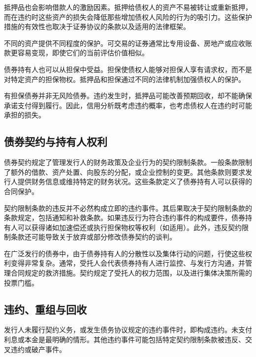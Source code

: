 抵押品也会影响借款人的激励因素。抵押给债权人的资产不易被转让或重新抵押，而在违约时这些资产的损失会降低那些增加债权人风险的行为的吸引力。这些保护措施的有效性也取决于证券协议的条款以及适用的法律框架。

不同的资产提供不同程度的保护。可交易的证券通常比专用设备、房地产或应收账款更容易变现，即使它们的当前评估价值相似。

债券持有人也可以从担保中受益。担保使债权人能够对担保人享有请求权，而不是对特定资产的担保物权。抵押品和担保通过不同的法律机制加强债权人的保护。

\begin{tcolorbox}[
  enhanced,
  breakable,
  colback=white,
  colframe=FinanceBlue,
  boxrule=0.7pt,
  sharp corners,
  borderline west={2.2pt}{0pt}{FinanceBlue},
  title=\textbf{财务展望：安全债券并非无风险之选},
  coltitle=white,
  colbacktitle=FinanceBlue,
  fonttitle=\bfseries,
  before skip=1.2em,
  after skip=1.2em
]

有担保债券并非无风险债券。违约发生时，抵押品可能改善预期回收，却不能确保承诺支付得到履行。因此，信用分析既考虑违约概率，也考虑债权人在违约时可能承担的损失。

\end{tcolorbox}

\subsection{债券契约与持有人权利}

债券契约规定了管理发行人的财务政策及企业行为的契约限制条款。一般条款限制了额外的借款、资产处置、向股东的分配，或企业控制的变更。其他条款则要求发行人提供财务信息或维持特定的财务状况。这些条款定义了债券持有人可以获得的合同保护。

契约限制条款的违反并不必然构成立即的违约事件。其后果取决于契约限制条款的条款规定，包括通知和补救条款。如果违反行为符合违约事件的构成要件，债券持有人可以获得诸如加速偿还或执行担保物权等权利（如适用）。此外，违反契约限制条款还可能导致关于放弃或部分修改债券契约的谈判。

在广泛发行的债券中，由于债券持有人的分散性以及集体行动的问题，行使这些权利变得非常复杂。通常，受托人会代表债券持有人进行监控、与发行方沟通，并管理合同规定的救济措施。契约规定了受托人的权力范围，以及进行集体决策所需的投票门槛。

\subsection{违约、重组与回收}

发行人未履行契约义务，或发生债务协议规定的违约事件时，即构成违约。未支付利息或本金是最明确的情形。其他违约事件可能包括特定契约限制条款被违反、交叉违约或破产事件。


